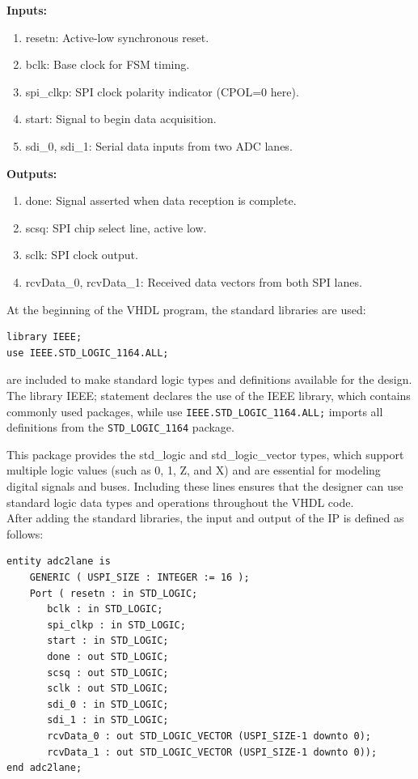 	\textbf{Inputs:}
	\begin{enumerate}
	\item resetn: Active-low synchronous reset.
	\item bclk: Base clock for FSM timing.
	\item spi\_clkp: SPI clock polarity indicator (CPOL=0 here).
	\item start: Signal to begin data acquisition.
	\item sdi\_0, sdi\_1: Serial data inputs from two ADC lanes.
	\end{enumerate}
	\textbf{Outputs:}
	\begin{enumerate}
	\item done: Signal asserted when data reception is complete.
	\item scsq: SPI chip select line, active low.
	\item sclk: SPI clock output.
	\item rcvData\_0, rcvData\_1: Received data vectors from both SPI lanes.
	\end{enumerate}
	At the beginning of the VHDL program, the standard libraries are used: 
\begin{verbatim}
library IEEE;
use IEEE.STD_LOGIC_1164.ALL;
\end{verbatim}

are included to make standard logic types and definitions available for the design. The library IEEE; statement declares the use of the IEEE library, which contains commonly used packages, while use \texttt{IEEE.STD\_LOGIC\_1164.ALL;} imports all definitions from the \texttt{STD\_LOGIC\_1164} package.
	
This package provides the std\_logic and std\_logic\_vector types, which support multiple logic values (such as 0, 1, Z, and X) and are essential for modeling digital signals and buses. Including these lines ensures that the designer can use standard logic data types and operations throughout the VHDL code.\\

After adding the standard libraries, the input and output of the IP is defined as follows:
\begin{verbatim}
entity adc2lane is
    GENERIC ( USPI_SIZE : INTEGER := 16 );
    Port ( resetn : in STD_LOGIC;
       bclk : in STD_LOGIC;
       spi_clkp : in STD_LOGIC;
       start : in STD_LOGIC;
       done : out STD_LOGIC;
       scsq : out STD_LOGIC;
       sclk : out STD_LOGIC;
       sdi_0 : in STD_LOGIC;
       sdi_1 : in STD_LOGIC;
       rcvData_0 : out STD_LOGIC_VECTOR (USPI_SIZE-1 downto 0);
       rcvData_1 : out STD_LOGIC_VECTOR (USPI_SIZE-1 downto 0));
end adc2lane;
\end{verbatim}
 
